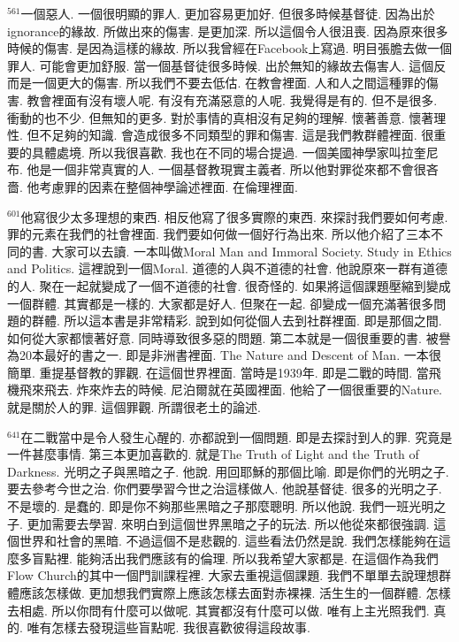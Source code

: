 \documentclass{book}
\begin{document}
$^{561}$一個惡人.
一個很明顯的罪人.
更加容易更加好.
但很多時候基督徒.
因為出於ignorance的緣故.
所做出來的傷害.
是更加深.
所以這個令人很沮喪.
因為原來很多時候的傷害.
是因為這樣的緣故.
所以我曾經在Facebook上寫過.
明目張膽去做一個罪人.
可能會更加舒服.
當一個基督徒很多時候.
出於無知的緣故去傷害人.
這個反而是一個更大的傷害.
所以我們不要去低估.
在教會裡面.
人和人之間這種罪的傷害.
教會裡面有沒有壞人呢.
有沒有充滿惡意的人呢.
我覺得是有的.
但不是很多.
衝動的也不少.
但無知的更多.
對於事情的真相沒有足夠的理解.
懷著善意.
懷著理性.
但不足夠的知識.
會造成很多不同類型的罪和傷害.
這是我們教群體裡面.
很重要的具體處境.
所以我很喜歡.
我也在不同的場合提過.
一個美國神學家叫拉奎尼布.
他是一個非常真實的人.
一個基督教現實主義者.
所以他對罪從來都不會很吝嗇.
他考慮罪的因素在整個神學論述裡面.
在倫理裡面.

$^{601}$他寫很少太多理想的東西.
相反他寫了很多實際的東西.
來探討我們要如何考慮.
罪的元素在我們的社會裡面.
我們要如何做一個好行為出來.
所以他介紹了三本不同的書.
大家可以去讀.
一本叫做Moral Man and Immoral Society.
Study in Ethics and Politics.
這裡說到一個Moral.
道德的人與不道德的社會.
他說原來一群有道德的人.
聚在一起就變成了一個不道德的社會.
很奇怪的.
如果將這個課題壓縮到變成一個群體.
其實都是一樣的.
大家都是好人.
但聚在一起.
卻變成一個充滿著很多問題的群體.
所以這本書是非常精彩.
說到如何從個人去到社群裡面.
即是那個之間.
如何從大家都懷著好意.
同時導致很多惡的問題.
第二本就是一個很重要的書.
被譽為20本最好的書之一.
即是非洲書裡面.
The Nature and Descent of Man.
一本很簡單.
重提基督教的罪觀.
在這個世界裡面.
當時是1939年.
即是二戰的時間.
當飛機飛來飛去.
炸來炸去的時候.
尼泊爾就在英國裡面.
他給了一個很重要的Nature.
就是關於人的罪.
這個罪觀.
所謂很老土的論述.

$^{641}$在二戰當中是令人發生心醒的.
亦都說到一個問題.
即是去探討到人的罪.
究竟是一件甚麼事情.
第三本更加喜歡的.
就是The Truth of Light and the Truth of Darkness.
光明之子與黑暗之子.
他說.
用回耶穌的那個比喻.
即是你們的光明之子.
要去參考今世之治.
你們要學習今世之治這樣做人.
他說基督徒.
很多的光明之子.
不是壞的.
是蠢的.
即是你不夠那些黑暗之子那麼聰明.
所以他說.
我們一班光明之子.
更加需要去學習.
來明白到這個世界黑暗之子的玩法.
所以他從來都很強調.
這個世界和社會的黑暗.
不過這個不是悲觀的.
這些看法仍然是說.
我們怎樣能夠在這麼多盲點裡.
能夠活出我們應該有的倫理.
所以我希望大家都是.
在這個作為我們Flow Church的其中一個門訓課程裡.
大家去重視這個課題.
我們不單單去說理想群體應該怎樣做.
更加想我們實際上應該怎樣去面對赤裸裸.
活生生的一個群體.
怎樣去相處.
所以你問有什麼可以做呢.
其實都沒有什麼可以做.
唯有上主光照我們.
真的.
唯有怎樣去發現這些盲點呢.
我很喜歡彼得這段故事.
\end{document}
